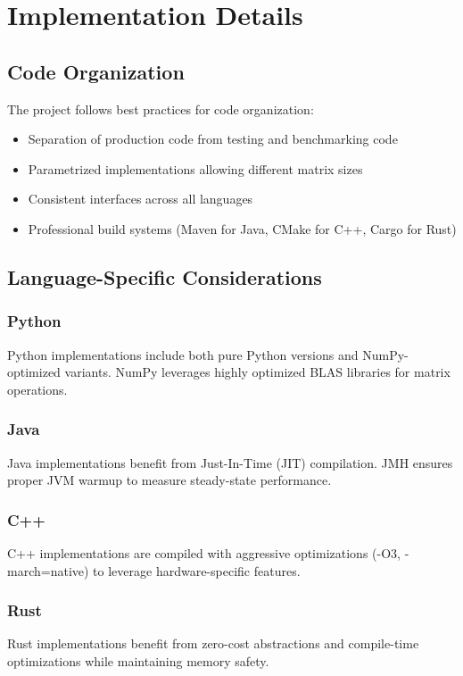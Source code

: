 \documentclass[11pt,a4paper]{article}
\begin{document}
\section{Implementation Details}

\subsection{Code Organization}

The project follows best practices for code organization:

\begin{itemize}
    \item Separation of production code from testing and benchmarking code
    \item Parametrized implementations allowing different matrix sizes
    \item Consistent interfaces across all languages
    \item Professional build systems (Maven for Java, CMake for C++, Cargo for Rust)
\end{itemize}

\subsection{Language-Specific Considerations}

\subsubsection{Python}
Python implementations include both pure Python versions and NumPy-optimized variants. NumPy leverages highly optimized BLAS libraries for matrix operations.

\subsubsection{Java}
Java implementations benefit from Just-In-Time (JIT) compilation. JMH ensures proper JVM warmup to measure steady-state performance.

\subsubsection{C++}
C++ implementations are compiled with aggressive optimizations (-O3, -march=native) to leverage hardware-specific features.

\subsubsection{Rust}
Rust implementations benefit from zero-cost abstractions and compile-time optimizations while maintaining memory safety.
\end{document}
